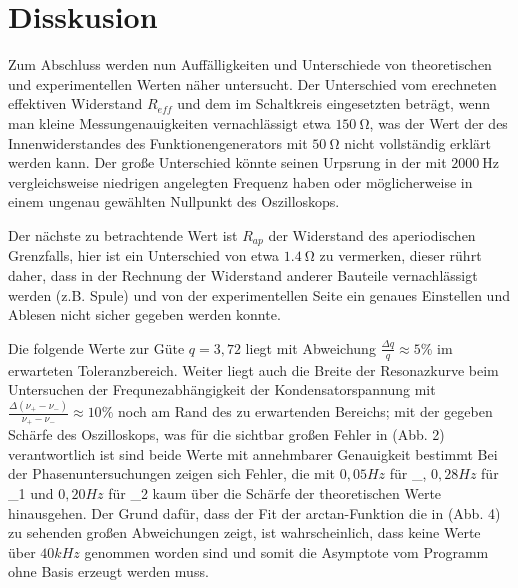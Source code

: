 
\usepackage[locale=DE,separate-uncertainty=true,per-mode=symbol-or-fraction]{siunitx}

  \section{Disskusion}
  \label{sec:Disskusion}
Zum Abschluss werden nun Auffälligkeiten und Unterschiede von theoretischen und experimentellen Werten näher untersucht.
Der Unterschied vom erechneten effektiven Widerstand $R_{eff}$ und dem im Schaltkreis eingesetzten beträgt, wenn man kleine Messungenauigkeiten vernachlässigt
etwa $\SI{150}{\ohm}$, was der Wert der des Innenwiderstandes des Funktionengenerators mit $\SI{50}{\ohm}$ nicht vollständig erklärt werden kann.
Der große Unterschied könnte seinen Urpsrung in der mit $\SI{2000}{\hertz}$ vergleichsweise niedrigen angelegten Frequenz haben oder möglicherweise in einem ungenau gewählten Nullpunkt des Oszilloskops.

Der nächste zu betrachtende Wert ist $R_{ap}$ der Widerstand des aperiodischen Grenzfalls, hier ist ein Unterschied von etwa $\SI{1,4}{\ohm}$ zu vermerken, dieser rührt daher,
dass in der Rechnung der Widerstand anderer Bauteile vernachlässigt werden (z.B. Spule) und von der experimentellen Seite ein genaues Einstellen und Ablesen nicht sicher gegeben werden konnte.

Die folgende Werte zur Güte $q = 3,72 $ liegt mit Abweichung $\frac{\Delta q}{q} \approx 5\%$ im erwarteten Toleranzbereich.
Weiter liegt auch die Breite der Resonazkurve beim Untersuchen der Frequnezabhängigkeit der Kondensatorspannung mit $\frac{\Delta (\nu_+-\nu_-)}{\nu_+-\nu_-} \approx 10\%$ noch am Rand des zu erwartenden Bereichs;
mit der gegeben Schärfe des Oszilloskops, was für die sichtbar großen Fehler in (Abb. 2) verantwortlich ist sind beide Werte mit annehmbarer Genauigkeit bestimmt
Bei der Phasenuntersuchungen zeigen sich Fehler, die mit $0,05 Hz$ für \nu_{}, $0,28 Hz$ für \nu_1 und $0,20 Hz$ für \nu_2 kaum über die Schärfe der theoretischen Werte hinausgehen.
Der Grund dafür, dass der Fit der arctan-Funktion die in (Abb. 4) zu sehenden großen Abweichungen zeigt, ist wahrscheinlich, dass keine Werte über $40 kHz$ genommen worden sind und somit die Asymptote vom Programm ohne Basis erzeugt werden muss.
